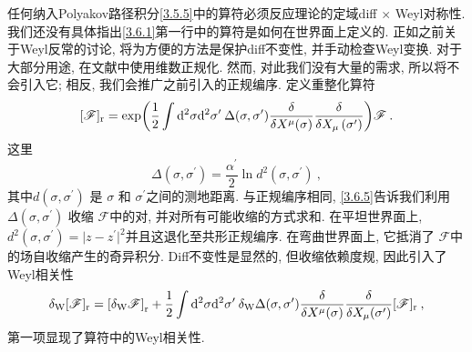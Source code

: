 任何纳入Polyakov路径积分\eqref{3.5.5}中的算符必须反应理论的定域diff $\times$ Weyl对称性. 我们还没有具体指出\eqref{3.6.1}第一行中的算符是如何在世界面上定义的. 正如之前关于Weyl反常的讨论, 将为方便的方法是保护diff不变性, 并手动检查Weyl变换. 对于大部分用途, 在文献中使用维数正规化. 然而, 对此我们没有大量的需求, 所以将不会引入它; 相反, 我们会推广之前引入的正规编序. 定义重整化算符
\begin{equation}\label{3.6.5}
[\mathscr{F}]_{\mathrm{r}}=\exp \biggl(\frac{1}{2} \int \mathrm{d}^{2} \sigma \mathrm{d}^{2} \sigma^{\prime}\: \Delta(\sigma, \sigma^{\prime}) \frac{\delta}{\delta X^{\mu}(\sigma)} \frac{\delta}{\delta X_{\mu}\left(\sigma^{\prime}\right)}\biggr) \mathscr{F} \:.
\end{equation}
这里
\begin{equation}
\Delta(\sigma, \sigma^{\prime})=\frac{\alpha^{\prime}}{2} \ln d^{2}(\sigma, \sigma^{\prime}) \:, \label{3.6.6}
\end{equation}
其中$d(\sigma, \sigma^{\prime})$ 是 $\sigma$ 和 $\sigma^{\prime}$之间的测地距离. 与正规编序相同, \eqref{3.6.5}告诉我们利用 $\Delta(\sigma, \sigma^{\prime})$ 收缩 $\mathscr{F}$中的对, 并对所有可能收缩的方式求和. 在平坦世界面上, $d^{2}(\sigma, \sigma^{\prime})=\lvert z-z^{\prime}\rvert^{2}$并且这退化至共形正规编序. 在弯曲世界面上, 它抵消了 $\mathscr{F}$中的场自收缩产生的奇异积分. Diff不变性是显然的, 但收缩依赖度规, 因此引入了Weyl相关性
\begin{equation}\label{3.6.7}
\delta_{\mathrm{W}}[\mathscr{F}]_{\mathrm{r}}=\left[\delta_{\mathrm{W}} \mathscr{F}\right]_{\mathrm{r}}+\frac{1}{2} \int \mathrm{d}^{2} \sigma 
\mathrm{d}^{2} \sigma^{\prime} \:\delta_{\mathrm{W}} \Delta(\sigma, \sigma^{\prime}) \frac{\delta}{\delta X^{\mu}(\sigma)} \frac{\delta}{\delta X_{\mu}(\sigma^{\prime})}[\mathscr{F}]_{\mathrm{r}} \:,
\end{equation}
第一项显现了算符中的Weyl相关性.

